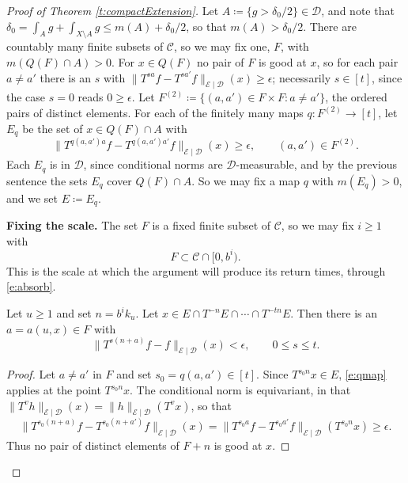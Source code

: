 \begin{proof}[Proof of Theorem \ref{t:compactExtension}]
Let $A \coloneqq \{ g > \delta _0/2\} \in \mathcal D$, and note that $\delta _0 = \int_A g + \int _{X \setminus A} g \leq m(A) + \delta _0/2$, 
so that $m(A) > \delta _0/2$.  
There are countably many finite subsets of $\mathcal C$, so we may fix one, $F$, with $m (Q(F) \cap A)>0$.  
For $x \in Q(F)$ no pair of $F$ is good at $x$, so for each pair $a \neq a'$ there is an $s$ with 
$\lVert T^{sa}f-T^{sa'}f\rVert _{\mathcal E\mid \mathcal D}(x) \geq \epsilon$; necessarily $s \in [t]$, since the case $s=0$ reads $0 \geq \epsilon$.  Let $F ^{(2)} \coloneqq \{ (a,a') \in F \times F \colon a \neq a'\}$, the ordered pairs of distinct elements.  
For each of the finitely many maps $q \colon F ^{(2)} \to [t]$, let $E_q$ be the set of $x \in Q(F) \cap A$ with 
\begin{equation} \label{e:qmap}
\lVert T^{q(a,a')a}f-T^{q(a,a')a'}f\rVert _{\mathcal E\mid \mathcal D}(x) \geq \epsilon , 
\qquad (a,a') \in F ^{(2)} . 
\end{equation}
Each $E_q$ is in $\mathcal D$, since conditional norms are $\mathcal D$-measurable, and by the previous sentence the sets $E_q$ cover $Q(F) \cap A$.  
So we may fix a map $q$ with $m(E_q)>0$, and we set $E \coloneqq E_q$.

\smallskip 
\noindent \textbf{Fixing the scale.}  
The set $F$ is a fixed finite subset of $\mathcal C$, so we may fix $i \geq 1$ with 
\begin{equation} \label{e:scale}
F \subset \mathcal C \cap [0, b ^{i}) . 
\end{equation}
This is the scale at which the argument will produce its return times, through \eqref{e:absorb}.  

\begin{lemma} \label{l:returnTime}
Let $u \geq 1$ and set $n = b ^{i}k_u$.  Let $x \in E \cap T ^{-n}E \cap \cdots \cap T ^{-tn}E$.  
Then there is an $a = a(u,x) \in F$ with 
\begin{equation} \label{e:good0}
\lVert T ^{s(n+a)}f - f \rVert _{\mathcal E\mid \mathcal D}(x) < \epsilon , \qquad 0 \leq s \leq t . 
\end{equation}
\end{lemma}

\begin{proof}
Let $a \neq a'$ in $F$ and set $s_0 = q(a,a') \in [t]$.  Since $T ^{s_0 n}x \in E$, \eqref{e:qmap} applies at the point $T ^{s_0n}x$.  
The conditional norm is equivariant, in that $\lVert T ^{v} h \rVert _{\mathcal E\mid \mathcal D}(x) = \lVert h \rVert _{\mathcal E\mid \mathcal D}(T ^{v}x)$, so that 
\begin{equation}
\lVert T ^{s_0(n+a)}f - T ^{s_0 (n+a')}f \rVert _{\mathcal E\mid \mathcal D}(x) 
= \lVert T ^{s_0a}f - T ^{s_0a'}f \rVert _{\mathcal E\mid \mathcal D}(T ^{s_0n}x) \geq \epsilon . 
\end{equation}
Thus no pair of distinct elements of $F + n$ is good at $x$.  


\end{proof}
\end{proof}
